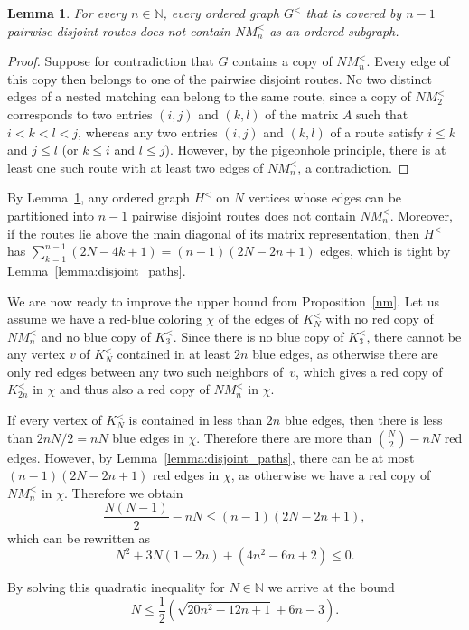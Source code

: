 \documentclass[11pt,a4paper]{article}
\newtheorem{lemma}[thm]{Lemma}
\theoremstyle{remark}
\begin{document}
\begin{lemma}
\label{lem-routes}
For every $n \in \mathbb{N}$, every ordered graph $G^<$ that is covered by $n-1$ pairwise disjoint routes does not contain $NM^<_n$ as an ordered subgraph.
\end{lemma}
\begin{proof}
Suppose for contradiction that $G$ contains a copy of $NM^<_n$. 
Every edge of this copy then belongs to one of the pairwise disjoint routes. No two distinct edges of a nested matching can belong to the same route, since a copy of $NM^<_2$ corresponds to two entries $(i,j)$ and $(k,l)$ of the matrix $A$ such that $i<k<l<j$, whereas any two entries $(i,j)$ and $(k,l)$ of a route satisfy $i\leq k$ and $j\leq l$ (or $k\leq i$ and $l\leq j$). However, by the pigeonhole principle, there is at least one such route with at least two edges of $NM^<_n$, a contradiction.
\end{proof}

By Lemma~\ref{lem-routes},
any ordered graph $H^<$ on $N$ vertices whose edges can be partitioned into $n-1$ pairwise disjoint routes does not contain $NM^<_n$.
Moreover, if the routes lie above the main diagonal of its matrix representation, then $H^<$ has $\sum_{k=1}^{n-1}(2N-4k+1) =(n-1)(2N-2n+1)$ edges, which is tight by Lemma~\ref{lemma:disjoint_paths}.


We are now ready to improve the upper bound from Proposition~\ref{nm}. Let us assume we have a red-blue coloring $\chi$ of the edges of $K^<_N$ with no red copy of $NM_n^<$ and no blue copy of $K^<_3$. Since there is no blue copy of $K^<_3$, there cannot be any vertex $v$ of $K^<_N$ contained in at least $2n$ blue edges, as otherwise there are only red edges between any two such neighbors of~$v$, which gives a red copy of $K^<_{2n}$ in $\chi$ and thus also a red copy of $NM^<_n$ in $\chi$.

If every vertex of $K^<_N$ is contained in less than $2n$ blue edges, then there is less than $2nN/2 = nN$ blue edges in $\chi$. Therefore there are more than $\binom{N}{2}-nN$ red edges. However, by Lemma~\ref{lemma:disjoint_paths}, there can be at most $(n-1)(2N-2n+1)$ red edges in $\chi$, as otherwise we have a red copy of $NM^<_n$ in $\chi$. Therefore we obtain
\[\frac{N(N-1)}{2}-nN \leq (n-1)(2N-2n+1),\]
which can be rewritten as
\[N^2+3N(1-2n)+(4n^2-6n+2) \leq 0.\]

By solving this quadratic inequality for $N\in\mathbb{N}$ we arrive at the bound \[N \leq \frac{1}{2}\left(\sqrt{20n^2-12n+1} + 6n-3\right).\]
\end{document}

